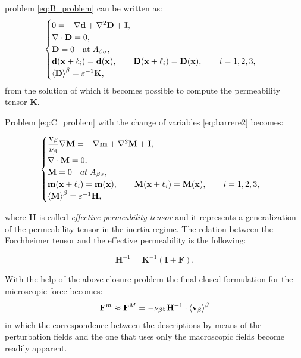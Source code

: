 \noindent problem \eqref{eq:B_problem} can be written as:
\begin{eqnarray}
	\begin{cases}
		0 = -\nabla \mathbf{d} + \nabla^2 \mathbf{D} +\mathbf{I},\\
		\nabla \cdot \mathbf{D} = 0,  \\
		\mathbf{D} = 0 \quad \textrm{at} \; A_{\beta \sigma} ,\\
		\mathbf{d}(\mathbf{x} +\ell_i) = \mathbf{d}(\mathbf{x}), \qquad \mathbf{D}(\mathbf{x} +\ell_i) = \mathbf{D}(\mathbf{x}), \qquad i=1,2,3 ,\\
		{\left< \mathbf{D} \right>}^{\beta} = \varepsilon^{-1} \mathbf{K},
	\end{cases}
\label{eq:D_problem}
\end{eqnarray}
from the solution of which it becomes possible to compute the permeability tensor $\mathbf{K}$.

\noindent Problem \eqref{eq:C_problem} with the change of variables \eqref{eq:barrere2} becomes:

\begin{eqnarray}
	\begin{cases}
		\dfrac{\textbf{v}_{\beta}}{\nu_{\beta}} \nabla \mathbf{M} = -\nabla \mathbf{m} + \nabla^2 \mathbf{M} +\mathbf{I},\\
		\nabla \cdot \mathbf{M} = 0,  \\
		\mathbf{M} = 0 \quad at \; A_{\beta \sigma}, \\
		\mathbf{m}(\mathbf{x} +\ell_i) = \mathbf{m}(\mathbf{x}), \qquad \mathbf{M}(\mathbf{x} +\ell_i) = \mathbf{M}(\mathbf{x}), \qquad i=1,2,3 ,\\
		{\left< \mathbf{M} \right>}^{\beta} = \varepsilon^{-1} \mathbf{H},
	\end{cases}
\label{eq:M_problem}
\end{eqnarray}

\noindent where $\mathbf{H}$ is called \textit{effective permeability tensor} and it represents a generalization of the permeability tensor in the inertia regime.
The relation between the Forchheimer tensor and the effective permeability is the following:

$$
\mathbf{H}^{-1} = \mathbf{K}^{-1} \left(\mathbf{I} +\mathbf{F}\right).
$$

With the help of the above closure problem the final closed formulation for the microscopic force becomes:
\begin{equation}
\mathbf{F}^m \approx \mathbf{F}^M = - \nu_{\beta} \varepsilon \mathbf{H}^{-1} \cdot {\left< \textbf{v}_{\beta}\right>}^{\beta}
\label{eq:closure_final}
\end{equation}
in which the correspondence between the descriptions by means of the perturbation fields and the one that uses only the macroscopic fields become readily apparent.

